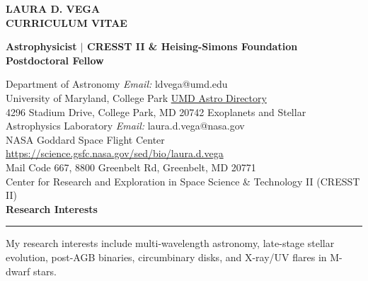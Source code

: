 \documentclass[letter,11pt]{article}
\begin{document}
\pagestyle{fancy}
\fancyhf{}
\renewcommand{\headrulewidth}{0pt}


\begin{center} 
\bfseries{
\LARGE \uppercase{Laura D. Vega} \\
\large \uppercase{Curriculum Vitae}}
\end{center}

\noindent
\begin{center}{\bf Astrophysicist \(|\) CRESST II \& Heising-Simons Foundation Postdoctoral Fellow} \\
\end{center}

\noindent Department of Astronomy \hfill \textit{Email:} ldvega@umd.edu \\
\noindent University of Maryland, College Park \hfill \href{https://www.astro.umd.edu/people/directory.html#Postdocs\%20and\%20Faculty\%20Assistants}{UMD Astro Directory}  \\
4296 Stadium Drive, College Park, MD 20742
\vskip 0.1in
\noindent Exoplanets and Stellar Astrophysics Laboratory \hfill \textit{Email:} laura.d.vega@nasa.gov
\\ 
NASA Goddard Space Flight Center \hfill
\url{https://science.gsfc.nasa.gov/sed/bio/laura.d.vega} \\
Mail Code 667, 8800 Greenbelt Rd, Greenbelt, MD 20771 \\

\noindent Center for Research and Exploration in Space Science \& Technology II (CRESST II) \\


\noindent
{\bf Research Interests} \\
\vspace{-10mm}
\begin{center}
\rule{\textwidth}{0.2mm}
\end{center}
\vspace{-3mm}
\noindent
My research interests include multi-wavelength astronomy, late-stage stellar evolution, post-AGB binaries, circumbinary disks, and X-ray/UV flares in M-dwarf stars.
\end{document}
